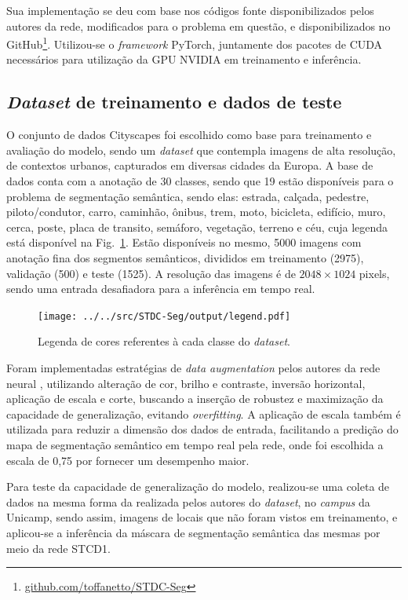 \documentclass[conference]{IEEEtran}
\begin{document}
Sua implementação se deu com base nos códigos fonte disponibilizados pelos autores da rede, modificados para o problema em questão, e disponibilizados no GitHub\footnote{\href{https://github.com/toffanetto/STDC-Seg}{github.com/toffanetto/STDC-Seg}}. Utilizou-se o \textit{framework} PyTorch, juntamente dos pacotes de CUDA necessários para utilização da GPU NVIDIA em treinamento e inferência.


\subsection{\textit{Dataset} de treinamento e dados de teste}

O conjunto de dados Cityscapes \cite{cordts2016CityscapesDatasetSemantic} foi escolhido como base para treinamento e avaliação do modelo, sendo um \textit{dataset} que contempla imagens de alta resolução, de contextos urbanos, capturados em diversas cidades da Europa. A base de dados conta com a anotação de 30 classes, sendo que 19 estão disponíveis para o problema de segmentação semântica, sendo elas: estrada, calçada, pedestre, piloto/condutor, carro, caminhão, ônibus, trem, moto, bicicleta, edifício, muro, cerca, poste, placa de transito, semáforo, vegetação, terreno e céu, cuja legenda está disponível na Fig.~\ref{fig:legend}. Estão disponíveis no mesmo, 5000 imagens com anotação fina dos segmentos semânticos, divididos em treinamento (2975), validação (500) e teste (1525). A resolução das imagens é de $2048 \times 1024$ pixels, sendo uma entrada desafiadora para a inferência em tempo real.

\begin{figure}[h!]
	\centering
	\texttt{[image: ../../src/STDC-Seg/output/legend.pdf]}
	\caption{Legenda de cores referentes à cada classe do \textit{dataset}.}
	\label{fig:legend}
\end{figure}

Foram implementadas estratégias de \textit{data augmentation} pelos autores da rede neural \cite{fan2021RethinkingBiSeNetRealtime}, utilizando alteração de cor, brilho e contraste, inversão horizontal, aplicação de escala e corte, buscando a inserção de robustez e maximização da capacidade de generalização, evitando \textit{overfitting}. A aplicação de escala também é utilizada para reduzir a dimensão dos dados de entrada, facilitando a predição do mapa de segmentação semântico em tempo real pela rede, onde foi escolhida a escala de 0,75 por fornecer um desempenho maior.

Para teste da capacidade de generalização do modelo, realizou-se uma coleta de dados na mesma forma da realizada pelos autores do \textit{dataset}, no \textit{campus} da Unicamp, sendo assim, imagens de locais que não foram vistos em treinamento, e aplicou-se a inferência da máscara de segmentação semântica das mesmas por meio da rede STCD1.
\end{document}

